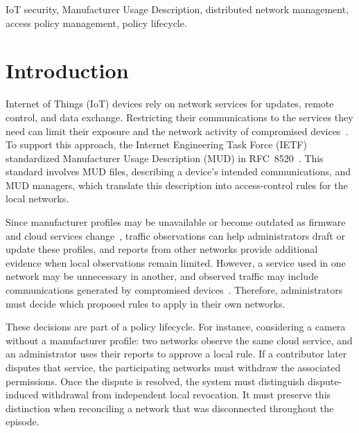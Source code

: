 \documentclass[journal]{IEEEtran}
\theoremstyle{definition}
\begin{document}
\begin{IEEEkeywords}
IoT security, Manufacturer Usage Description, distributed network management, access policy management, policy lifecycle.
\end{IEEEkeywords}




\section{Introduction}
\label{sec:introduction}
Internet of Things (IoT) devices rely on network services for updates, remote control, and data exchange. Restricting their communications to the services they need can limit their exposure and the network activity of compromised devices~\cite{mirai,hernandezramos2021mudreview}. To support this approach, the Internet Engineering Task Force (IETF) standardized Manufacturer Usage Description (MUD) in RFC~8520~\cite{rfc8520}. This standard involves MUD files, describing a device's intended communications, and MUD managers, which translate this description into access-control rules for the local networks.

Since manufacturer profiles may be unavailable or become outdated as firmware and cloud services change~\cite{hernandezramos2021mudreview,allowlistvariability}, traffic observations can help administrators draft or update these profiles, and reports from other networks provide additional evidence when local observations remain limited. However, a service used in one network may be unnecessary in another, and observed traffic may include communications generated by compromised devices~\cite{allowlistvariability,mirai}. Therefore, administrators must decide which proposed rules to apply in their own networks.

These decisions are part of a policy lifecycle. For instance, considering a camera without a manufacturer profile: two networks observe the same cloud service, and an administrator uses their reports to approve a local rule. If a contributor later disputes that service, the participating networks must withdraw the associated permissions. Once the dispute is resolved, the system must distinguish dispute-induced withdrawal from independent local revocation. It must preserve this distinction when reconciling a network that was disconnected throughout the episode.
\end{document}
